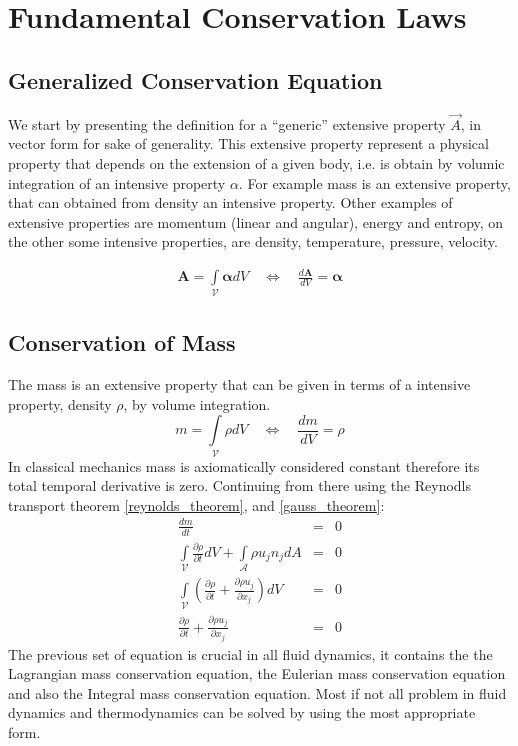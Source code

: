 \chapter{Fundamental Conservation Laws}
\label{fundamentals}

\section{Generalized Conservation Equation}
We start by presenting the definition for a ``generic'' extensive property $\vec{A}$, in vector form for sake of generality. This extensive property represent a physical property that depends on the extension of a given body, i.e. is obtain by volumic integration of an intensive property $\alpha$. For example mass is an extensive property, that can obtained from density an intensive property. Other examples of extensive properties are momentum (linear and angular), energy and entropy, on the other some intensive properties, are density, temperature, pressure, velocity.
\begin{defi} 
\begin{align}
  \boldsymbol{A}=\int\limits_{\mathcal{V}} \boldsymbol\alpha dV \quad 
  \Leftrightarrow \quad  \frac{d\boldsymbol A}{dV}=\boldsymbol \alpha
\end{align}
\end{defi}

\newpage

\section{Conservation of Mass}
The mass is an extensive property that can be given in terms of a intensive property, density $\rho$, by volume integration.
\begin{equation}
m=\int\limits_{\mathcal{V}}\rho dV  \quad  \Leftrightarrow \quad  \frac{dm}{dV}= \rho
\end{equation}
In classical mechanics mass is axiomatically considered constant therefore its total temporal derivative is zero. Continuing from there using the Reynodls transport theorem \eqref{reynolds_theorem}, and \eqref{gauss_theorem}: 
\begin{eqnarray}
    \frac{dm}{dt} &=& 0\\
    \int\limits_{\mathcal{V}} \frac{\partial \rho}{\partial t} dV + \int\limits_{\mathcal{A}} \rho u_j n_j dA &=& 0 \\
    \int\limits_{\mathcal{V}} \left(\frac{\partial \rho}{\partial t} + \frac{\partial \rho u_j}{\partial x_j} \right) dV  &=& 0 \\
    \frac{\partial \rho}{\partial t} +  \frac{\partial \rho u_j}{\partial x_j} &=& 0 
\end{eqnarray}
The previous set of equation is crucial in all fluid dynamics, it contains the the Lagrangian mass conservation equation, the Eulerian mass conservation equation and also the Integral mass conservation equation. Most if not all problem in fluid dynamics and thermodynamics can be solved by using the most appropriate form.  


